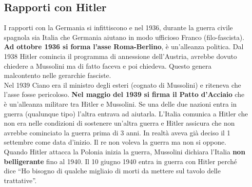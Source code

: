 \subsection{Rapporti con Hitler}
I rapporti con la Germania si infittiscono e nel 1936, durante la guerra civile spagnola sia Italia 
che Germania aiutano in modo ufficioso Franco (filo-fascista). \textbf{Ad ottobre 1936 si forma 
l'asse Roma-Berlino}, è un'alleanza politica. Dal 1938 Hitler comincia il programma di annessione
dell'Austria, avrebbe dovuto chiedere a Mussolini ma di fatto faceva e poi chiedeva. Questo genera
malcontento nelle gerarchie fasciste.\\
Nel 1939 Ciano era il ministro degli esteri (cognato di Mussolini) e riteneva che l'asse fosse 
pericoloso. \textbf{Nel maggio del 1939 si firma il Patto d'Acciaio} che è un'alleanza militare tra
Hitler e Mussolini. Se una delle due nazioni entra in guerra (qualunque tipo) l'altra entrava ad
aiutarla. L'Italia comunica a Hitler che non era nelle condizioni di sostenere un'altra guerra e
Hitler assicura che non avrebbe cominciato la guerra prima di 3 anni. In realtà aveva già deciso il
1 settembre come data d'inizio. Il re non voleva la guerra ma non si oppone.\\
Quando Hitler attacca la Polonia inizia la guerra, Mussolini dichiara l'Italia \textbf{non 
belligerante} fino al 1940. Il 10 giugno 1940 entra in guerra con Hitler perché dice ``Ho bisogno di
qualche migliaio di morti da mettere sul tavolo delle trattative''.
